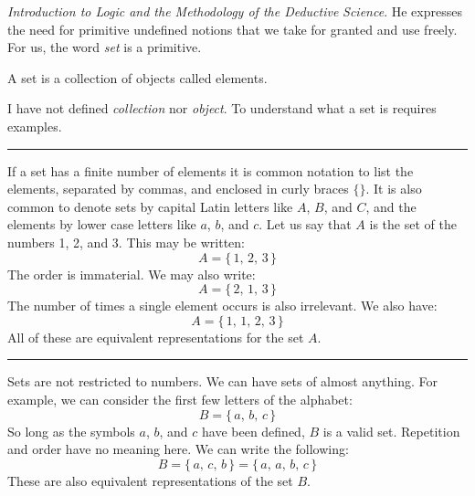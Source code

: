         \textit{Introduction to Logic and the Methodology of the Deductive}
        \textit{Science}. He expresses the need for primitive
        undefined notions that we take for granted and use freely. For us, the
        word \textit{set} is a primitive.
        \begin{definition}
            A \gls{set} is a collection of objects called elements.
        \end{definition}
        I have not defined \textit{collection} nor \textit{object}. To
        understand what a set is requires examples.
        \par\hfill\par\hrule
        \begin{example}
            If a set has a finite number of
            elements it is common notation to list the elements, separated by
            commas, and enclosed in curly braces $\{\}$. It is also common to
            denote sets by capital Latin letters like $A$, $B$, and $C$, and
            the elements by lower case letters like $a$, $b$, and $c$. Let us
            say that $A$ is the set of the numbers 1, 2, and 3.
            This may be written:
            \begin{equation}
                A=\{\,1,\,2,\,3\,\}
            \end{equation}
            The order is immaterial. We may also write:
            \begin{equation}
                A=\{\,2,\,1,\,3\,\}
            \end{equation}
            The number of times a single element occurs is also irrelevant. We
            also have:
            \begin{equation}
                A=\{\,1,\,1,\,2,\,3\,\}
            \end{equation}
            All of these are equivalent representations for the set $A$.
        \end{example}
        \hrule
        \begin{example}
            Sets are not restricted to numbers. We can have sets of almost
            anything. For example, we can consider the first few letters of
            the alphabet:
            \begin{equation}
                B=\{\,a,\,b,\,c\,\}
            \end{equation}
            So long as the symbols $a$, $b$, and $c$ have been defined, $B$ is
            a valid set. Repetition and order have no meaning here. We can write
            the following:
            \begin{equation}
                B=\{\,a,\,c,\,b\,\}=\{\,a,\,a,\,b,\,c\,\}
            \end{equation}
            These are also equivalent representations of the set $B$.
        \end{example}
